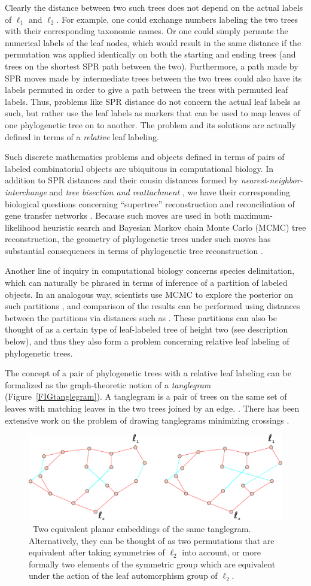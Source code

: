 \documentclass{amsart}
\newcommand{\arxiv}[1]{#1}
\newcommand{\FIGtanglegram}{\
\label{FIGtanglegram}
\begin{figure}
  \arxiv{\includegraphics[width=5in]{figures/relabeling-example}}
\caption{\
  Two equivalent planar embeddings of the same tanglegram.
  Alternatively, they can be thought of as two permutations that are equivalent after taking symmetries of $\ell_2$ into account, or more formally two elements of the symmetric group which are equivalent under the action of the leaf automorphism group of $\ell_2$.
}
\end{figure}
}
\begin{document}
Clearly the distance between two such trees does not depend on the actual labels of $\ell_1$ and $\ell_2$.
For example, one could exchange numbers labeling the two trees with their corresponding taxonomic names.
Or one could simply permute the numerical labels of the leaf nodes, which would result in the same distance if the permutation was applied identically on both the starting and ending trees (and trees on the shortest SPR path between the two).
Furthermore, a path made by SPR moves made by intermediate trees between the two trees could also have its labels permuted in order to give a path between the trees with permuted leaf labels.
Thus, problems like SPR distance do not concern the actual leaf labels as such, but rather use the leaf labels as markers that can be used to map leaves of one phylogenetic tree on to another.
The problem and its solutions are actually defined in terms of a \emph{relative} leaf labeling.

Such discrete mathematics problems and objects defined in terms of pairs of labeled combinatorial objects are ubiquitous in computational biology.
In addition to SPR distances and their cousin distances formed by \emph{nearest-neighbor-interchange} and \emph{tree bisection and reattachment} \cite{wiki:treeRearrangement}, we have their corresponding biological questions concerning ``supertree'' reconstruction \cite{Whidden2014-ku} and reconciliation of gene transfer networks \cite{Boon2013-mc}.
Because such moves are used in both maximum-likelihood heuristic search and Bayesian Markov chain Monte Carlo (MCMC) tree reconstruction, the geometry of phylogenetic trees under such moves has substantial consequences in terms of phylogenetic tree reconstruction \cite{Whidden2014-yt}.

Another line of inquiry in computational biology concerns species delimitation, which can naturally be phrased in terms of inference of a partition of labeled objects.
In an analogous way, scientists use MCMC to explore the posterior on such partitions \cite{Yang2010-kc}, and comparison of the results can be performed using distances between the partitions via distances such as \cite{Gusfield2002-il}.
These partitions can also be thought of as a certain type of leaf-labeled tree of height two (see description below), and thus they also form a problem concerning relative leaf labeling of phylogenetic trees.

The concept of a pair of phylogenetic trees with a relative leaf labeling can be formalized as the graph-theoretic notion of a \emph{tanglegram} (Figure~\ref{FIGtanglegram}).
A tanglegram is a pair of trees on the same set of leaves with matching leaves in the two trees joined by an edge. \cite{Venkatachalam2010-zh}.
There has been extensive work on the problem of drawing tanglegrams minimizing crossings \cite{Buchin2008-lc,Lozano2008-tp,Bansal2009-ni,Bocker2009-xl,Fernau2010-an,Venkatachalam2010-zh}.
\FIGtanglegram
\end{document}
